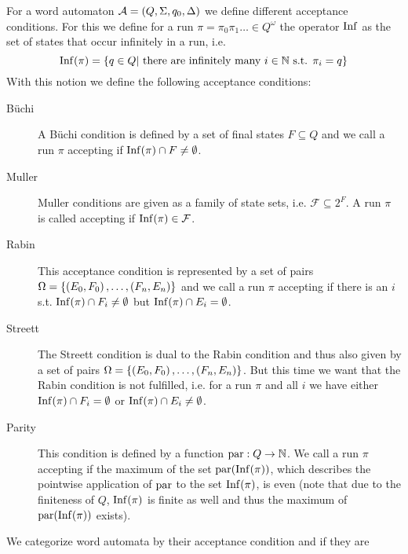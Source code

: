 \begin{definition}
  For a word automaton $\mathcal{A} = \left(Q, \Sigma, q_{0}, \Delta\right)$ we
  define different acceptance conditions. For this we define for a run
  $\pi = \pi_{0}\pi_{1}\dots\in Q^{\omega}$ the operator
  $\operatorname{Inf}$ as the set of states that occur infinitely in a run, i.e.
  \begin{equation*}
    \operatorname{Inf}(\pi) = \left\{q\in Q\middle| \text{ there are infinitely many }
    i\in\mathbb{N} \text{ s.t. } \pi_{i} = q\right\}
  \end{equation*}
  With this notion we define the following acceptance conditions:
  \begin{description}
    \item [Büchi] A Büchi condition is defined by a set of final states
      $F\subseteq Q$ and we call a run $\pi$ accepting if
      $\operatorname{Inf}(\pi)\cap F\neq\emptyset$.
    \item [Muller] Muller conditions are given as a family of state sets, i.e.
      $\mathcal{F}\subseteq 2^{F}$. A run $\pi$ is called accepting if
      $\operatorname{Inf}(\pi)\in\mathcal{F}$.
    \item [Rabin] This acceptance condition is represented by a set of pairs\\
      $\Omega = \left\{\left(E_{0}, F_{0}\right), \dots, \left(F_{n}, E_{n}\right)\right\}$ and we
      call a run $\pi$ accepting if there is an $i$ s.t.
      $\operatorname{Inf}(\pi)\cap F_{i}\neq\emptyset$ but $\operatorname{Inf}(\pi)\cap E_{i} = \emptyset$.
    \item [Streett] The Streett condition is dual to the Rabin condition and
      thus also given by a set of pairs
      $\Omega = \left\{\left(E_{0}, F_{0}\right), \dots, \left(F_{n}, E_{n}\right)\right\}$. But
      this time we want that the Rabin condition is not fulfilled, i.e. for a
      run $\pi$ and all $i$ we have either $\operatorname{Inf}(\pi)\cap F_{i} = \emptyset$ or
      $\operatorname{Inf}(\pi)\cap E_{i} \neq \emptyset$.
    \item [Parity] This condition is defined
      by a function
      $\operatorname{par}:Q\rightarrow \mathbb{N}$. We call a run $\pi$ accepting if the
      maximum of the set $\operatorname{par}(\operatorname{Inf}(\pi))$, which describes the pointwise
      application of $\operatorname{par}$ to the set $\operatorname{Inf}(\pi)$, is even (note that due
      to the finiteness of $Q$, $\operatorname{Inf}(\pi)$ is finite as well and thus the
      maximum of $\operatorname{par}(\operatorname{Inf}(\pi))$ exists).
  \end{description}
\end{definition} 
We categorize word automata by their acceptance condition and if they are
